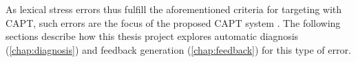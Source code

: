 	As lexical stress errors thus fulfill the aforementioned criteria for targeting with CAPT, such errors are the focus of the proposed CAPT system . The following sections describe how this thesis project explores automatic diagnosis (\cref{chap:diagnosis}) and feedback generation (\cref{chap:feedback}) for this type of error.		
		

	

